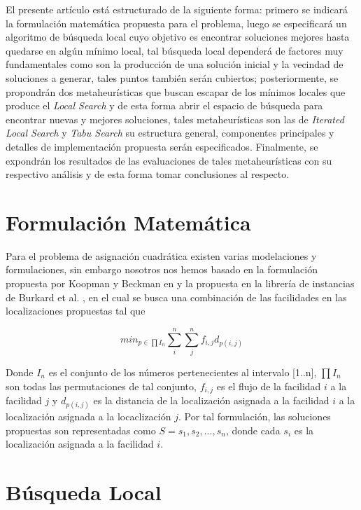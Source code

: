 \documentclass{ci5652}
\begin{document}
El presente artículo está estructurado de la siguiente forma: primero se indicará la formulación matemática propuesta para el problema, luego se especificará un algoritmo de búsqueda local cuyo objetivo es encontrar soluciones mejores hasta quedarse en algún mínimo local, tal búsqueda local dependerá de factores muy fundamentales como son la producción de una solución inicial y la vecindad de soluciones a generar, tales puntos también serán cubiertos; posteriormente, se propondrán dos metaheurísticas que buscan escapar de los mínimos locales que produce el \textit{Local Search} y de esta forma abrir el espacio de búsqueda para encontrar nuevas y mejores soluciones, tales metaheurísticas son las de \textit{Iterated Local Search} y \textit{Tabu Search} su estructura general, componentes principales y detalles de implementación propuesta serán especificados. Finalmente, se expondrán los resultados de las evaluaciones de tales metaheurísticas con su respectivo análisis y de esta forma tomar conclusiones al respecto. 

\section{Formulación Matemática}

Para el problema de asignación cuadrática existen varias modelaciones y formulaciones, sin embargo nosotros nos hemos basado en la formulación propuesta por Koopman y Beckman en \cite{koopmans1957} y la propuesta en la librería de instancias de Burkard et al. \cite{burkard2012}, en el cual se busca una combinación de las facilidades en las localizaciones propuestas tal que

\[min_{p\in \prod I_{n}} \sum_{i}^{n}\sum_{j}^{n}f_{i,j}d_{p(i,j)}\]

Donde \(I_{n}\) es el conjunto de los números pertenecientes al intervalo [1..n], \(\prod I_{n}\) son todas las permutaciones de tal conjunto, \(f_{i,j}\) es el flujo de la facilidad \(i\) a la facilidad \(j\) y \(d_{p(i,j)}\) es la distancia de la localización asignada a la facilidad \(i\) a la localización asignada a la locaclización \(j\). Por tal formulación, las soluciones propuestas son representadas como \(S = {s_{1}}, s_{2}, ..., s_{n}\), donde cada \(s_{i}\) es la localización asignada a la facilidad \(i\).


\section{Búsqueda Local}
\end{document}
